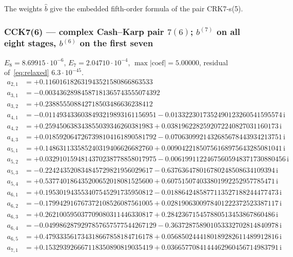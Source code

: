 The weights $\hat b$ give the embedded fifth-order formula of the pair CRK7-s(5).
\subsubsection*{CCK7(6) --- complex Cash--Karp pair $7(6)$; $b^{(7)}$ on all eight stages, $b^{(6)}$ on the first seven}
$E_{8}=8.69915\cdot10^{-6}$, $E_{7}=2.04710\cdot10^{-4}$, $\max|\text{coef}|=5.00000$, residual of~\eqref{eq:relaxed} $6.3\cdot10^{-45}$.
{\small\allowdisplaybreaks
\begin{align*}
a_{2,1} &= +0.116016182631943521580866863533\\
a_{3,1} &= -0.00343628984587181365743555074392\\
a_{3,2} &= +0.238855508842718503486636238412\\
a_{4,1} &= -0.0114934336038493219893161156951 - 0.0133223017352490123260541595574\,\mathrm{i}\\
a_{4,2} &= +0.259450638343855039346260381983 + 0.0381962282592072240827031160173\,\mathrm{i}\\
a_{4,3} &= +0.0185920647267398104161890581792 - 0.0706309921432685678443934213751\,\mathrm{i}\\
a_{5,1} &= +0.148631133585240319406626682760 + 0.00904221850756168975643285081041\,\mathrm{i}\\
a_{5,2} &= +0.0329101594814370238778858017975 - 0.00619911224675605948371730880456\,\mathrm{i}\\
a_{5,3} &= -0.224243520834845729821956029617 - 0.637636478016780248508634109394\,\mathrm{i}\\
a_{5,4} &= +0.537740186435200652018081525600 + 0.607515074033801992252957785471\,\mathrm{i}\\
a_{6,1} &= +0.195301943553407545291735950812 - 0.0188642485877113527188244477473\,\mathrm{i}\\
a_{6,2} &= -0.179942916767372108526087561005 + 0.0281906300978401222372523387117\,\mathrm{i}\\
a_{6,3} &= +0.262100595037709080311446330817 + 0.284236715457880513453867860486\,\mathrm{i}\\
a_{6,4} &= -0.0499862879297857657577544267129 - 0.363728758901053332702814840978\,\mathrm{i}\\
a_{6,5} &= +0.479333561734318667858184716178 + 0.0568502444180189282611489912816\,\mathrm{i}\\
a_{7,1} &= +0.153293926667118350890819035419 + 0.0366577084144462960456714983791\,\mathrm{i}\\

\end{align*}}

